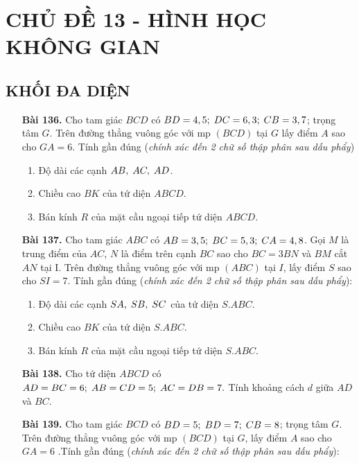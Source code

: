 \documentclass[12pt,a4paper]{article}
\begin{document}
\section*{CHỦ ĐỀ 13 - HÌNH HỌC KHÔNG GIAN }
\subsection*{KHỐI ĐA DIỆN}
\begin{enumerate}
    \item[\textbf{Bài 136.}] Cho tam giác $BCD$ có $BD = 4,5;\thickspace DC = 6,3;\thickspace CB = 3,7$; trọng tâm $G$. Trên đường thẳng vuông góc với mp $(BCD)$ tại $G$ lấy điểm $A$ sao cho $GA = 6$. Tính gần đúng (\textit{chính xác đến 2 chữ số thập phân sau dấu phẩy})
        \begin{enumerate}
            \item Độ dài các cạnh $AB,\thickspace AC,\thickspace AD$.
            \item Chiều cao $BK$ của tứ diện $ABCD$.
            \item Bán kính $R$ của mặt cầu ngoại tiếp tứ diện $ABCD$.
        \end{enumerate}
    \item[\textbf{Bài 137.}] Cho tam giác $ABC$ có $AB = 3,5;\thickspace BC = 5,3;\thickspace CA = 4,8$. Gọi $M$ là trung điểm của $AC$, $N$ là điểm trên cạnh $BC$ sao cho $BC = 3BN$ và $BM$ cắt $AN$ tại I. Trên đường thẳng vuông góc với mp $(ABC)$ tại $I$, lấy điểm $S$ sao cho $SI = 7$. Tính gần đúng (\textit{chính xác đến 2 chữ số thập phân sau dấu phẩy}):
        \begin{enumerate}
            \item Độ dài các cạnh $SA,\thickspace SB,\thickspace SC$ của tứ diện $S.ABC$.
            \item Chiều cao $BK$ của tứ diện $S.ABC$.
            \item Bán kính $R$ của mặt cầu ngoại tiếp tứ diện $S.ABC$.
        \end{enumerate}
    \item[\textbf{Bài 138.}] Cho tứ diện $ABCD$ có $AD=BC=6;\thickspace AB=CD=5;\thickspace AC=DB=7.$ Tính khoảng cách $d$ giữa $AD$ và $BC$.
    \item[\textbf{Bài 139.}] Cho tam giác $BCD$ có $BD = 5;\thickspace BD = 7; \thickspace CB = 8$; trọng tâm $G$. Trên đường thẳng vuông góc với mp $(BCD)$ tại $G$, lấy điểm $A$ sao cho $GA = 6$ .Tính gần đúng (\textit{chính xác đến 2 chữ số thập phân sau dấu phẩy}):
        \begin{enumerate}

\end{enumerate}
\end{enumerate}
\end{document}
